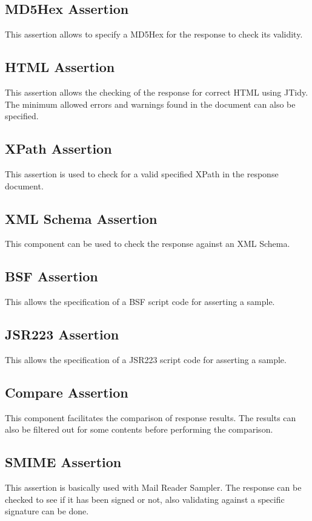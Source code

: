 \documentclass[12pt]{book}
\begin{document}
 \subsection{MD5Hex Assertion}
 This assertion allows to specify a MD5Hex for the response to check its validity.
 
 \subsection{HTML Assertion}
 This assertion allows the checking of the response for correct HTML using JTidy.
 The minimum allowed errors and warnings found in the document can also be specified.
 
 \subsection{XPath Assertion}
 This assertion is used to check for a valid specified XPath in the response document.
 
 \subsection{XML Schema Assertion}
 This component can be used to check the response against an XML Schema.
 
 \subsection{BSF Assertion}
 This allows the specification of a BSF script code for asserting a sample.
 
 \subsection{JSR223 Assertion}
 This allows the specification of a JSR223 script code for asserting a sample.
 
 \subsection{Compare Assertion}
 This component facilitates the comparison of response results. The results can also be filtered out for some contents before performing the comparison. 
 
 \subsection{SMIME Assertion}
 This assertion is basically used with Mail Reader Sampler. The response can be checked to see if it has been signed or not, also validating 
 against a specific signature can be done.
 
\end{document}
